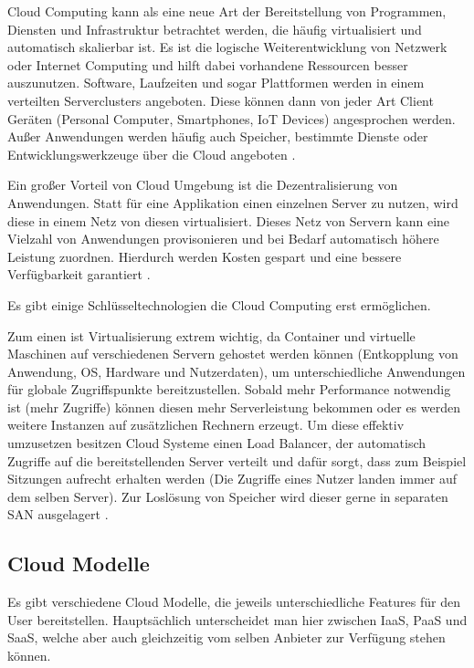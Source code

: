 
Cloud Computing kann als eine neue Art der Bereitstellung von Programmen, Diensten und Infrastruktur betrachtet werden, die häufig virtualisiert und automatisch skalierbar ist. Es ist die logische Weiterentwicklung von Netzwerk oder Internet Computing und hilft dabei vorhandene Ressourcen besser auszunutzen. 
Software, Laufzeiten und sogar Plattformen werden in einem verteilten Serverclusters angeboten. Diese können dann von jeder Art  Client Geräten (Personal Computer, Smartphones, \ac{IoT} Devices) angesprochen werden. Außer Anwendungen werden häufig  auch Speicher, bestimmte Dienste oder Entwicklungswerkzeuge über die Cloud angeboten \parencite[S. 3]{furth.2010}.

Ein großer Vorteil von Cloud Umgebung ist die Dezentralisierung von Anwendungen. Statt für eine Applikation einen einzelnen Server zu nutzen, wird diese in einem Netz von diesen virtualisiert. Dieses Netz von Servern kann eine Vielzahl von Anwendungen provisonieren und bei Bedarf automatisch höhere Leistung zuordnen. Hierdurch werden Kosten gespart und eine bessere Verfügbarkeit garantiert \parencite[S. 7]{furth.2010}.

Es gibt einige Schlüsseltechnologien die Cloud Computing erst ermöglichen. 

Zum einen ist Virtualisierung extrem wichtig, da Container und virtuelle Maschinen auf verschiedenen Servern gehostet werden können (Entkopplung von Anwendung, OS, Hardware und Nutzerdaten), um unterschiedliche Anwendungen für globale Zugriffspunkte bereitzustellen. 
Sobald mehr Performance notwendig ist (mehr Zugriffe) können diesen mehr Serverleistung bekommen oder es werden weitere Instanzen auf zusätzlichen Rechnern erzeugt.
Um diese effektiv umzusetzen besitzen Cloud Systeme einen Load Balancer, der automatisch Zugriffe auf die bereitstellenden Server verteilt und dafür sorgt, dass zum Beispiel Sitzungen aufrecht erhalten werden (Die Zugriffe eines Nutzer landen immer auf dem selben Server).
Zur Loslösung von Speicher wird dieser gerne in separaten \acs{SAN} ausgelagert \parencite[S. 22]{rafaels.2015}.
\subsection{Cloud Modelle}

Es gibt verschiedene Cloud Modelle, die jeweils unterschiedliche Features für den User bereitstellen. Hauptsächlich unterscheidet man hier zwischen \ac{IaaS}, \ac{PaaS} und \ac{SaaS}, welche aber auch gleichzeitig vom selben Anbieter zur Verfügung stehen können.

